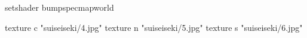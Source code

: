 setshader bumpspecmapworld

	texture c "suiseiseki/4.jpg"
	texture n "suiseiseki/5.jpg"
	texture s "suiseiseki/6.jpg"
